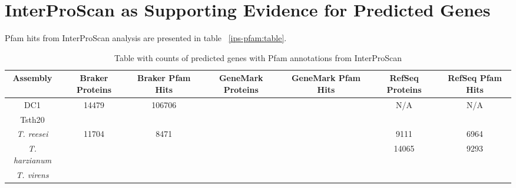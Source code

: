 \section{InterProScan as Supporting Evidence for Predicted Genes}

Pfam hits from InterProScan analysis are presented in table
~\ref{ips-pfam:table}.

\begin{table}
  \begin{center}
    \begin{tabular}{|c|c|c|c|c|c|c|}
      \hline
      Assembly & Braker Proteins & Braker Pfam Hits & GeneMark Proteins & GeneMark Pfam Hits & RefSeq Proteins & RefSeq Pfam Hits  \\ \hline
      DC1 & 14479 & 106706 &   &   & N/A & N/A \\ \hline
      Tsth20 &  &  &  &  &  &  \\ \hline
      \textit{T. reesei} & 11704 & 8471 &  &  & 9111 & 6964 \\ \hline
      \textit{T. harzianum} &  &  &  &  & 14065 & 9293 \\ \hline
      \textit{T. virens} &  &  &  &  & &  \\ \hline
    \end{tabular}
  \end{center}
  \caption[InterProScan Pfam Evidence]{Table with counts of predicted genes with Pfam annotations from InterProScan}
  \label{table:regioncounts}
\end{table}
